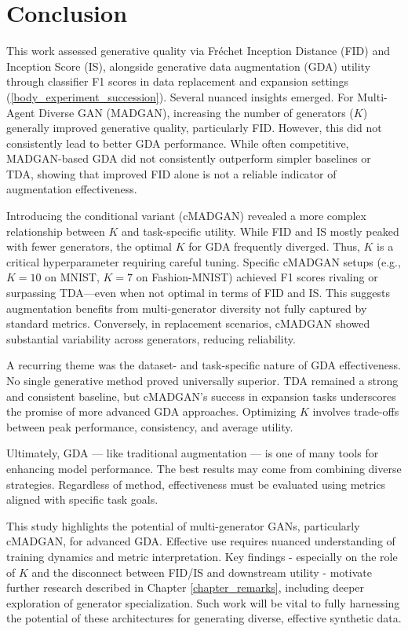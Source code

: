 \section{Conclusion}\label{conclusion}

This work assessed generative quality via Fréchet Inception Distance (FID) and Inception Score (IS), alongside generative data augmentation (GDA) utility through classifier F1 scores in data replacement and expansion settings (\ref{body_experiment_succession}). Several nuanced insights emerged. For Multi-Agent Diverse GAN (MADGAN), increasing the number of generators (\(K\)) generally improved generative quality, particularly FID. However, this did not consistently lead to better GDA performance. While often competitive, MADGAN-based GDA did not consistently outperform simpler baselines or TDA, showing that improved FID alone is not a reliable indicator of augmentation effectiveness.

Introducing the conditional variant (cMADGAN) revealed a more complex relationship between \(K\) and task-specific utility. While FID and IS mostly peaked with fewer generators, the optimal \(K\) for GDA frequently diverged. Thus, \(K\) is a critical hyperparameter requiring careful tuning. Specific cMADGAN setups (e.g., \(K=10\) on MNIST, \(K=7\) on Fashion-MNIST) achieved F1 scores rivaling or surpassing TDA—even when not optimal in terms of FID and IS. This suggests augmentation benefits from multi-generator diversity not fully captured by standard metrics. Conversely, in replacement scenarios, cMADGAN showed substantial variability across generators, reducing reliability.

A recurring theme was the dataset- and task-specific nature of GDA effectiveness. No single generative method proved universally superior. TDA remained a strong and consistent baseline, but cMADGAN’s success in expansion tasks underscores the promise of more advanced GDA approaches. Optimizing \(K\) involves trade-offs between peak performance, consistency, and average utility.

Ultimately, GDA — like traditional augmentation — is one of many tools for enhancing model performance. The best results may come from combining diverse strategies. Regardless of method, effectiveness must be evaluated using metrics aligned with specific task goals.

This study highlights the potential of multi-generator GANs, particularly cMADGAN, for advanced GDA. Effective use requires nuanced understanding of training dynamics and metric interpretation. Key findings - especially on the role of \(K\) and the disconnect between FID/IS and downstream utility - motivate further research described in Chapter \ref{chapter_remarks}, including deeper exploration of generator specialization. Such work will be vital to fully harnessing the potential of these architectures for generating diverse, effective synthetic data.


